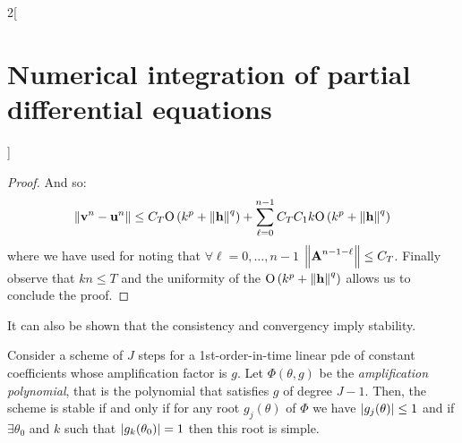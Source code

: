\documentclass[../../../main_math.tex]{subfiles}
\begin{document}
\begin{multicols}{2}[\section{Numerical integration of partial differential equations}]
\begin{proof}
    And so:
    $$
      \left\|\boldsymbol{\mathrm{v}}^n-\boldsymbol{\mathrm{u}}^n\right\|\leq C_T \mathrm{O}\left(k^p+\left\|\boldsymbol{\mathrm{h}}\right\|^q\right)+\sum_{\ell=0}^{n-1}C_T C_1k\mathrm{O}\left(k^p+\left\|\boldsymbol{\mathrm{h}}\right\|^q\right)
    $$
    where we have used  for noting that $\forall\ell=0,\ldots,n-1$ $\left\|\boldsymbol{\mathrm{A}}^{n-1-\ell}\right\|\leq C_T$.
    Finally observe that $kn\leq T$ and the uniformity of the $\mathrm{O}\left(k^p+\left\|\boldsymbol{\mathrm{h}}\right\|^q\right)$ allows us to conclude the proof.
  \end{proof}
  \begin{remark}
    It can also be shown that the consistency and convergency imply stability.
  \end{remark}
  \begin{theorem}
    Consider a scheme of $J$ steps for a 1st-order-in-time linear pde of constant coefficients whose amplification factor is $g$. Let $\Phi(\theta, g)$ be the \emph{amplification polynomial}, that is the polynomial that satisfies $g$ of degree $J-1$. Then, the scheme is stable if and only if for any root $g_j(\theta)$ of $\Phi$ we have $\abs{g_j(\theta)}\leq 1$ and if $\exists \theta_0$ and $k$ such that $\abs{g_k(\theta_0)}=1$ then this root is simple.
  \end{theorem}

\end{multicols}
\end{document}
